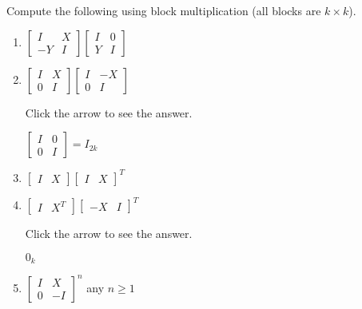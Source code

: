 \documentclass{ximera}
\begin{document}
\begin{problem}\label{prob:blockmatmult_vars}
Compute the following using block multiplication (all blocks are $k \times k$).

\begin{enumerate}
\item
$\left[ \begin{array}{rr}
I & X \\
-Y & I
\end{array} \right] \left[ \begin{array}{rr}
I & 0 \\
Y & I
\end{array} \right]
$

\item
$\left[ \begin{array}{rr}
I & X \\
0 & I
\end{array} \right] \left[ \begin{array}{rr}
I & -X \\
0 & I
\end{array} \right]
$

Click the arrow to see the answer.
\begin{expandable}
$\left[ \begin{array}{cc}
I & 0 \\
0 & I
\end{array} \right] = I_{2k}$
\end{expandable}

\item
$\left[ \begin{array}{cc}
I & X
\end{array} \right] \left[ \begin{array}{cc}
I & X
\end{array} \right]^{T}
$

\item
$\left[ \begin{array}{cc}
I & X^{T}
\end{array} \right] \left[ \begin{array}{cc}
-X & I
\end{array} \right]^{T}
$

Click the arrow to see the answer.
\begin{expandable}
$0_{k}$
\end{expandable}

\item %
$\left[ \begin{array}{cc}
I & X \\
0 & -I
\end{array} \right]^{n}
$ any $n \geq 1$


\end{enumerate}
\end{problem}
\end{document}
